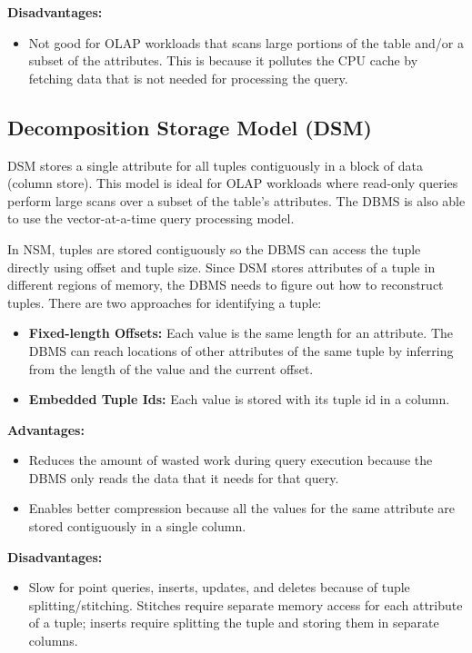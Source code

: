 \documentclass[11pt]{article}
\begin{document}
\textbf{Disadvantages:}
\begin{itemize}
    \item
    Not good for OLAP workloads that scans large portions of the table and/or a subset of the attributes. This is because it pollutes the CPU cache by fetching data that is not needed for processing
    the query.
\end{itemize}
    
\subsection*{Decomposition Storage Model (DSM)}
DSM stores a single attribute for all tuples contiguously in a block of data (column store). This model is ideal for OLAP workloads where read-only queries perform large scans over a subset of the table's attributes. The DBMS is also able to use the vector-at-a-time query processing model.

In NSM, tuples are stored contiguously so the DBMS can access the tuple directly using offset and tuple size. Since DSM stores attributes of a tuple in different regions of memory, the DBMS needs to figure out how to reconstruct tuples. There are two approaches for identifying a tuple:
\begin{itemize}
    \item \textbf{Fixed-length Offsets:} Each value is the same length for an attribute. The DBMS can reach locations of other attributes of the same tuple by inferring from the length of the value and the current offset.
    \item \textbf{Embedded Tuple Ids:} Each value is stored with its tuple id in a column.
\end{itemize}

\textbf{Advantages:}
\begin{itemize}
    \item
    Reduces the amount of wasted work during query execution because the DBMS only reads the data that it needs for that query.
    
    \item
    Enables better compression because all the values for the same attribute are stored contiguously in a single column.
\end{itemize}

\textbf{Disadvantages:}
\begin{itemize}
    \item
    Slow for point queries, inserts, updates, and deletes because of tuple splitting/stitching. Stitches require separate memory access for each attribute of a tuple; inserts require splitting the tuple and storing them in separate columns.
\end{itemize}
\end{document}
